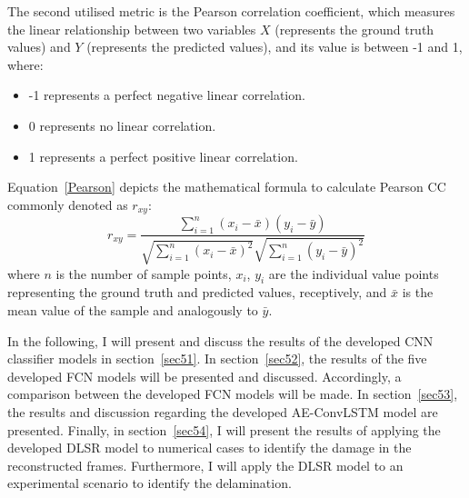 The second utilised metric is the Pearson correlation coefficient, which measures the linear relationship between two variables \(X\) (represents the ground truth values) and \(Y\) (represents the predicted values), and its value is between -1 and 1, where:
\begin{itemize}
	\item -1 represents a perfect negative linear correlation.
	\item 0 represents no linear correlation.
	\item 1 represents a perfect positive linear correlation.
\end{itemize}
Equation~\ref{Pearson} depicts the mathematical formula to calculate Pearson CC commonly denoted as \(r_{xy}\):
\begin{equation}
	r_{xy} = \frac{\sum_{i=1}^{n}(x_i - \bar{x})(y_i-\bar{y})}{\sqrt{\sum_{i=1}^{n}(x_i - \bar{x})^2}\sqrt{\sum_{i=1}^{n}(y_i - \bar{y})^2}}
	\label{Pearson}
\end{equation}
where \(n\) is the number of sample points, \(x_i\), \(y_i\) are the individual value points representing the ground truth and predicted values, receptively, and \(\bar{x}\) is the mean value of the sample and analogously to \(\bar{y}\).

In the following, I will present and discuss the results of the developed CNN classifier models in section~\ref{sec51}. 
In section~\ref{sec52}, the results of the five developed FCN models will be presented and discussed.
Accordingly, a comparison between the developed FCN models will be made.
In section~\ref{sec53}, the results and discussion regarding the developed AE-ConvLSTM model are presented.
Finally, in section~\ref{sec54}, I will present the results of applying the developed DLSR model to numerical cases to identify the damage in the reconstructed frames.
Furthermore, I will apply the DLSR model to an experimental scenario to identify the delamination.





